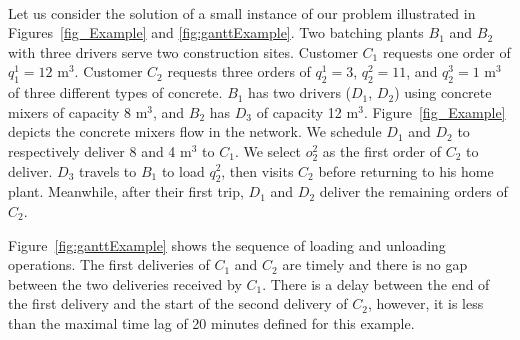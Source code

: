 \documentclass{article}
\begin{document}
\paragraph*{}
Let us consider the solution of a small instance of our problem illustrated in Figures~\ref{fig_Example} and \ref{fig:ganttExample}. Two batching plants $B_1$ and $B_2$ with three drivers serve two construction sites. Customer $C_1$ requests one order of $q^1_1=12$ m$^3$. Customer $C_2$ requests three orders of $q^1_2=3$, $q^2_2=11$, and $q^3_2=1$ m$^3$ of three different types of concrete. $B_1$ has two drivers ($D_1$, $D_2$) using concrete mixers of capacity 8 m$^3$, and $B_2$ has $D_3$ of capacity 12 m$^3$. Figure~\ref{fig_Example} depicts the concrete mixers flow in the network. We schedule $D_1$ and $D_2$ to respectively deliver 8 and 4 m$^3$ to $C_1$. We select $o^2_2$ as the first order of $C_2$ to deliver. $D_3$ travels to $B_1$ to load $q^2_2$, then visits $C_2$ before returning to his home plant. Meanwhile, after their first trip,  $D_1$ and $D_2$ deliver the remaining orders of $C_2$.

Figure~\ref{fig:ganttExample} shows the sequence of loading and unloading operations. The first deliveries of $C_1$ and $C_2$ are timely and there is no gap between the two deliveries received by $C_1$. There is a delay between the end of the first delivery and the start of the second delivery of $C_2$, however, it is less than the maximal time lag of 20 minutes defined for this example.
\end{document}
